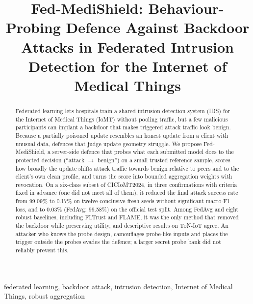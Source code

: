 \documentclass[conference]{IEEEtran}
\begin{document}
\title{Fed-MediShield: Behaviour-Probing Defence Against Backdoor Attacks in Federated Intrusion Detection for the Internet of Medical Things}

\author{
}

\maketitle

\begin{abstract}
Federated learning lets hospitals train a shared intrusion detection system (IDS) for the Internet of Medical Things (IoMT) without pooling traffic, but a few malicious participants can implant a backdoor that makes triggered attack traffic look benign. Because a partially poisoned update resembles an honest update from a client with unusual data, defences that judge update geometry struggle. We propose Fed-MediShield, a server-side defence that probes what each submitted model does to the protected decision (``attack $\rightarrow$ benign'') on a small trusted reference sample, scores how broadly the update shifts attack traffic towards benign relative to peers and to the client's own clean profile, and turns the score into bounded aggregation weights with revocation. On a six-class subset of CICIoMT2024, in three confirmations with criteria fixed in advance (one did not meet all of them), it reduced the final attack success rate from 99.09\% to 0.17\% on twelve conclusive fresh seeds without significant macro-F1 loss, and to 0.03\% (FedAvg: 99.58\%) on the official test split. Among FedAvg and eight robust baselines, including FLTrust and FLAME, it was the only method that removed the backdoor while preserving utility, and descriptive results on ToN-IoT agree. An attacker who knows the probe design, camouflages probe-like inputs and places the trigger outside the probes evades the defence; a larger secret probe bank did not reliably prevent this.
\end{abstract}

\begin{IEEEkeywords}
federated learning, backdoor attack, intrusion detection, Internet of Medical Things, robust aggregation
\end{IEEEkeywords}
\end{document}
